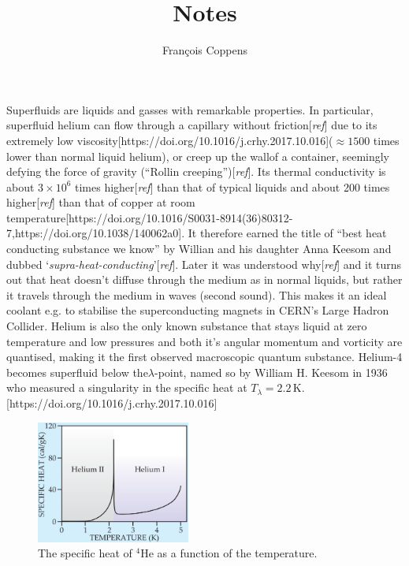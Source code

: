 \documentclass[11pt,a4paper,twoside]{article}
\author{François Coppens}
\title{Notes}
\newcommand{\unit}[1]{\,\mathrm{#1}}
\begin{document}
	Superfluids are liquids and gasses with remarkable properties. In particular, superfluid helium can flow through a capillary without friction[\emph{ref}] due to its extremely low viscosity[https://doi.org/10.1016/j.crhy.2017.10.016]($\approx\!1500$ times lower than normal liquid helium), or creep up the wallof a container, seemingly defying the force of gravity (``Rollin creeping'')[\emph{ref}]. Its thermal conductivity is about $3\times10^6$ times higher[\emph{ref}] than that of typical liquids and about 200 times higher[\emph{ref}] than that of copper at room temperature[https://doi.org/10.1016/S0031-8914(36)80312-7,https://doi.org/10.1038/140062a0]. It therefore earned the title of ``best heat conducting substance we know'' by Willian and his daughter Anna Keesom and dubbed `\emph{supra-heat-conducting}'[\emph{ref}]. Later it was understood why[\emph{ref}] and it turns out that heat doesn't diffuse through the medium as in normal liquids, but rather it travels through the medium in waves (second sound). This makes it an ideal coolant e.g. to stabilise the superconducting magnets in CERN's Large Hadron Collider. Helium is also the only known substance that stays liquid at zero temperature and low pressures and both it's angular momentum and vorticity are quantised, making it the first observed macroscopic quantum substance. Helium-4 becomes superfluid below the$\lambda$-point, named so by William H. Keesom in 1936 who measured a singularity in the specific heat at $T_\lambda=2.2\unit{K}$.[https://doi.org/10.1016/j.crhy.2017.10.016]\\
	
	\begin{figure}
		\begin{center}
			\includegraphics[width=0.45\textwidth]{specific-heat}
		\end{center}
		\caption{The specific heat of $^4$He as a function of the temperature.}
		\label{fig:specific-heat}
	\end{figure}	
	
\end{document}
